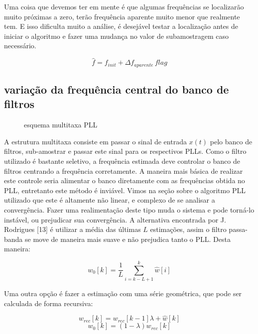 \documentclass[a4paper, 12pt]{book}
\begin{document}
\indent Uma coisa que devemos ter em mente é que algumas frequências se localizarão muito próximas a zero, terão frequência aparente muito menor que realmente tem. E isso dificulta muito a análise, é desejável testar a localização antes de iniciar o algoritmo e fazer uma mudança no valor de subamostragem caso necessário.

\begin{equation}
\hat{f}=f_{init}+\Delta f_{aparente}\, flag
\end{equation}

\subsection{variação da frequência central do banco de filtros}

\begin{figure}[h]
	\centering    
	\def\svgscale{0.7}
	
	\caption{esquema multitaxa PLL}
	\label{fig:esquema_pll}
\end{figure}

\indent A estrutura multitaxa consiste em passar o sinal de entrada $x(t)$ pelo banco de filtros, sub-amostrar e passar este sinal para os respectivos PLLs. Como o filtro utilizado é bastante seletivo, a frequência estimada deve controlar o banco de filtros centrando a frequência corretamente. A maneira mais básica de realizar este controle seria alimentar o banco diretamente com as frequências obtida no PLL, entretanto este método é inviável. Vimos na seção sobre o algoritmo PLL utilizado que este é altamente não linear, e complexo de se analisar a convergência. Fazer uma realimentação deste tipo muda o sistema e pode torná-lo instável, ou prejudicar sua convergência. A alternativa encontrada por J. Rodrigues [13]  é utilizar a média das últimas $L$ estimações, assim o filtro passa-banda se move de maneira mais suave e não prejudica tanto o PLL. Desta maneira:
   
\begin{equation}
w_0[k]=\frac{1}{L} \sum_{i=k-L+1}^{k}\hat{w}[i]
\end{equation}

\indent Uma outra opção é fazer a estimação com uma série geométrica, que pode ser calculada de forma recursiva:
 
\begin{equation}
w_{rec}[k]=w_{rec}[k-1]\lambda + \hat{w}[k]
\end{equation}
\begin{equation}
w_0[k]=(1-\lambda) w_{rec}[k]
\end{equation}
\end{document}
